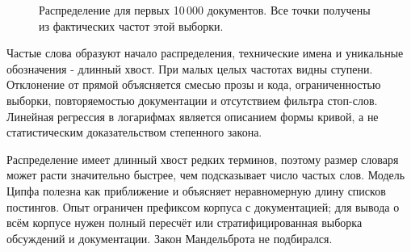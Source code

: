 \results

\begin{figure}[H]\centering
{}
\caption{Распределение для первых 10\,000 документов. Все точки получены из фактических частот этой выборки.}
\end{figure}
Частые слова образуют начало распределения, технические имена и
уникальные обозначения - длинный хвост. При малых целых частотах
видны ступени. Отклонение от прямой объясняется смесью прозы и кода,
ограниченностью выборки, повторяемостью документации и отсутствием
фильтра стоп-слов. Линейная регрессия в логарифмах является описанием
формы кривой, а не статистическим доказательством степенного закона.

\conclusions
Распределение имеет длинный хвост редких терминов, поэтому размер словаря
может расти значительно быстрее, чем подсказывает число частых слов.
Модель Ципфа полезна как приближение и объясняет неравномерную длину
списков постингов. Опыт ограничен префиксом корпуса с документацией;
для вывода о всём корпусе нужен полный пересчёт или стратифицированная
выборка обсуждений и документации. Закон Мандельброта не подбирался.
